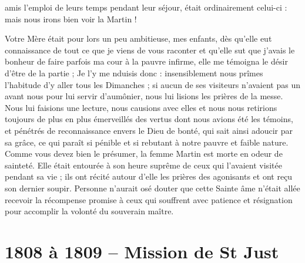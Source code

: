 \documentclass[11pt,a4paper]{report}
\begin{document}
amis l'emploi de leurs temps pendant leur séjour, était ordinairement celui-ci : mais nous irons bien voir la Martin !

Votre Mère était pour lors un peu ambitieuse, mes enfants, dès qu'elle eut connaissance de tout ce que je viens de vous raconter et qu'elle sut que j'avais le bonheur de faire parfois ma cour à la pauvre infirme, elle me témoigna le désir d'être de la partie ; Je l'y me nduisis donc : insensiblement nous prîmes l'habitude d'y aller tous les Dimanches ; si aucun de ses visiteurs n'avaient pas un avant nous pour lui servir d'aumônier, nous lui lisions les prières de la messe. Nous lui faisions une lecture, nous causions avec elles et nous nous retirions toujours de plus en plus émerveillés des vertus dont nous avions été les témoins, et pénétrés de reconnaissance envers le Dieu de bonté, qui sait ainsi adoucir par sa grâce, ce qui paraît si pénible et si rebutant à notre pauvre et faible nature. Comme vous devez bien le présumer, la femme Martin est morte en odeur de sainteté. Elle était entourée à son heure suprême de ceux qui l'avaient visitée pendant sa vie ; ils ont récité autour d'elle les prières des agonisants et ont reçu son dernier soupir. Personne n'aurait osé douter que cette Sainte âme n'était allée recevoir la récompense promise à ceux qui souffrent avec patience et résignation pour accomplir la volonté du souverain maître.

\section*{1808 à 1809 -- Mission de St Just}
\end{document}
